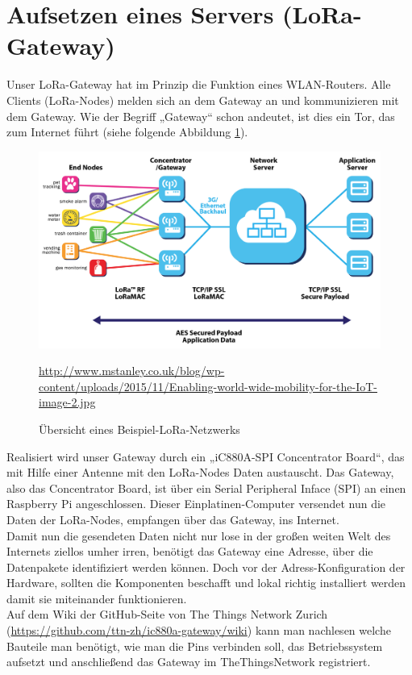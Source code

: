 \section{Aufsetzen eines Servers (LoRa-Gateway)}
Unser LoRa-Gateway hat im Prinzip die Funktion eines WLAN-Routers. Alle Clients (LoRa-Nodes) melden sich an dem Gateway an und kommunizieren mit dem Gateway. Wie der Begriff „Gateway“ schon andeutet, ist dies ein Tor, das zum Internet führt (siehe folgende Abbildung \ref{fig:lora-schaubild}).
\begin{figure}[H]
    \center
    \includegraphics[width=15cm]{Bilder/lora-schaubild.jpg}\\
    \caption{Übersicht eines Beispiel-LoRa-Netzwerks}
    \begin{center} \quelle\url{http://www.mstanley.co.uk/blog/wp-content/uploads/2015/11/Enabling-world-wide-mobility-for-the-IoT-image-2.jpg} \end{center}
    \label{fig:lora-schaubild}
\end{figure}
\noindent
Realisiert wird unser Gateway durch ein „iC880A-SPI Concentrator Board“, das mit Hilfe einer Antenne mit den LoRa-Nodes Daten austauscht. Das Gateway, also das Concentrator Board, ist über ein Serial Peripheral Inface (SPI) an einen Raspberry Pi angeschlossen. Dieser Einplatinen-Computer versendet nun die Daten der LoRa-Nodes, empfangen über das Gateway, ins Internet.\\
Damit nun die gesendeten Daten nicht nur lose in der großen weiten Welt des Internets ziellos umher irren, benötigt das Gateway eine Adresse, über die Datenpakete identifiziert werden können. Doch vor der Adress-Konfiguration der Hardware, sollten die Komponenten beschafft und lokal richtig installiert werden damit sie miteinander funktionieren.\\
Auf dem Wiki der GitHub-Seite von The Things Network Zurich (\url{https://github.com/ttn-zh/ic880a-gateway/wiki}) kann man nachlesen welche Bauteile man benötigt, wie man die Pins verbinden soll, das Betriebssystem aufsetzt und anschließend das Gateway im TheThingsNetwork registriert.\\
